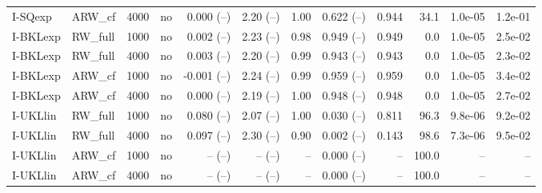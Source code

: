 \begin{tabular}{llrlrrrrrrrr}
I-SQexp & ARW\_cf & 4000 & no & 0.000 (--) & 2.20 (--) & 1.00 & 0.622 (--) & 0.944 & 34.1 & 1.0e-05 & 1.2e-01 \\
I-BKLexp & RW\_full & 1000 & no & 0.002 (--) & 2.23 (--) & 0.98 & 0.949 (--) & 0.949 & 0.0 & 1.0e-05 & 2.5e-02 \\
I-BKLexp & RW\_full & 4000 & no & 0.003 (--) & 2.20 (--) & 0.99 & 0.943 (--) & 0.943 & 0.0 & 1.0e-05 & 2.3e-02 \\
I-BKLexp & ARW\_cf & 1000 & no & -0.001 (--) & 2.24 (--) & 0.99 & 0.959 (--) & 0.959 & 0.0 & 1.0e-05 & 3.4e-02 \\
I-BKLexp & ARW\_cf & 4000 & no & 0.000 (--) & 2.19 (--) & 1.00 & 0.948 (--) & 0.948 & 0.0 & 1.0e-05 & 2.7e-02 \\
I-UKLlin & RW\_full & 1000 & no & 0.080 (--) & 2.07 (--) & 1.00 & 0.030 (--) & 0.811 & 96.3 & 9.8e-06 & 9.2e-02 \\
I-UKLlin & RW\_full & 4000 & no & 0.097 (--) & 2.30 (--) & 0.90 & 0.002 (--) & 0.143 & 98.6 & 7.3e-06 & 9.5e-02 \\
I-UKLlin & ARW\_cf & 1000 & no & -- (--) & -- (--) & -- & 0.000 (--) & -- & 100.0 & -- & -- \\
I-UKLlin & ARW\_cf & 4000 & no & -- (--) & -- (--) & -- & 0.000 (--) & -- & 100.0 & -- & -- \\
\hline
\end{tabular}
